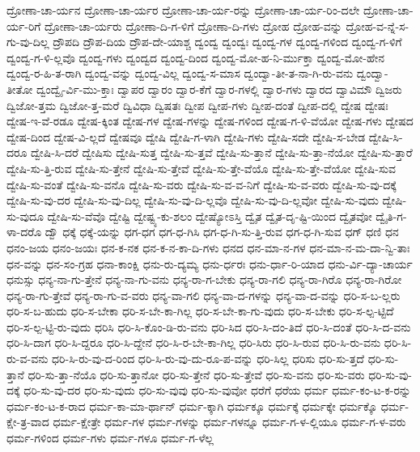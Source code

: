{ದ್ರೋಣಾ-ಚಾ-ರ್ಯನ
ದ್ರೋಣಾ-ಚಾ-ರ್ಯರ
ದ್ರೋಣಾ-ಚಾ-ರ್ಯ-ರನ್ನು
ದ್ರೋಣಾ-ಚಾ-ರ್ಯ-ರಿಂ-ದಲೇ
ದ್ರೋಣಾ-ಚಾ-ರ್ಯ-ರಿಗೆ
ದ್ರೋಣಾ-ಚಾ-ರ್ಯರು
ದ್ರೋಣಾ-ದಿ-ಗ-ಳಿಗೆ
ದ್ರೋಣಾ-ದಿ-ಗಳು
ದ್ರೋಹ
ದ್ರೋಹ-ವನ್ನು
ದ್ರೋಹ-ವ-ನ್ನೆ-ಸ-ಗು-ವು-ದಿಲ್ಲ
ದ್ರೌಪದಿ
ದ್ರೌಪ-ದಿಯ
ದ್ರೌಪ-ದೇ-ಯಾಶ್ಚ
ದ್ವಂದ್ವ
ದ್ವಂದ್ವಃ
ದ್ವಂದ್ವ-ಗಳ
ದ್ವಂದ್ವ-ಗಳಿಂದ
ದ್ವಂದ್ವ-ಗ-ಳಿಗೆ
ದ್ವಂದ್ವ-ಗ-ಳಿ-ಲ್ಲವೊ
ದ್ವಂದ್ವ-ಗಳು
ದ್ವಂದ್ವದ
ದ್ವಂದ್ವ-ದಿಂದ
ದ್ವಂದ್ವ-ಮೋ-ಹ-ನಿ-ರ್ಮುಕ್ತಾ
ದ್ವಂದ್ವ-ಮೋ-ಹೇನ
ದ್ವಂದ್ವ-ರ-ಹಿ-ತ-ರಾಗಿ
ದ್ವಂದ್ವ-ವನ್ನು
ದ್ವಂದ್ವ-ವಿಲ್ಲ
ದ್ವಂದ್ವ-ಸ-ಮಾಸ
ದ್ವಂದ್ವಾ-ತೀ-ತ-ನಾ-ಗಿ-ರು-ವನು
ದ್ವಂದ್ವಾ-ತೀತೋ
ದ್ವಂದ್ವೈ-ರ್ವಿ-ಮು-ಕ್ತಾಃ
ದ್ವಾಪರ
ದ್ವಾರಂ
ದ್ವಾರ-ಕೆಗೆ
ದ್ವಾರ-ಗಳಲ್ಲಿ
ದ್ವಾರ-ಗಳು
ದ್ವಾರದ
ದ್ವಾವಿಮೌ
ದ್ವಿಜರು
ದ್ವಿಜೋ-ತ್ತಮ
ದ್ವಿಜೋ-ತ್ತ-ಮರೆ
ದ್ವಿವಿಧಾ
ದ್ವಿಷತಃ
ದ್ವೀಪ
ದ್ವೀಪ-ಗಳು
ದ್ವೀಪ-ದಂತೆ
ದ್ವೀಪ-ದಲ್ಲಿ
ದ್ವೇಷ
ದ್ವೇಷಃ
ದ್ವೇಷ-ಇ-ವೆ-ರಡೂ
ದ್ವೇಷ-ಕ್ಕಿಂತ
ದ್ವೇಷ-ಗಳ
ದ್ವೇಷ-ಗಳನ್ನು
ದ್ವೇಷ-ಗಳಿಂದ
ದ್ವೇಷ-ಗ-ಳಿ-ವೆಯೋ
ದ್ವೇಷ-ಗಳು
ದ್ವೇಷದ
ದ್ವೇಷ-ದಿಂದ
ದ್ವೇಷ-ವಿ-ಲ್ಲದೆ
ದ್ವೇಷವೂ
ದ್ವೇಷಿ
ದ್ವೇಷಿ-ಗ-ಳಾಗಿ
ದ್ವೇಷಿ-ಗಳು
ದ್ವೇಷಿ-ಸದೇ
ದ್ವೇಷಿ-ಸ-ಬೇಡ
ದ್ವೇಷಿ-ಸಿ-ದರೂ
ದ್ವೇಷಿ-ಸಿ-ದರೆ
ದ್ವೇಷಿಸು
ದ್ವೇಷಿ-ಸುತ್ತ
ದ್ವೇಷಿ-ಸು-ತ್ತವೆ
ದ್ವೇಷಿ-ಸು-ತ್ತಾನೆ
ದ್ವೇಷಿ-ಸು-ತ್ತಾ-ನೆಯೋ
ದ್ವೇಷಿ-ಸು-ತ್ತಾರೆ
ದ್ವೇಷಿ-ಸು-ತ್ತಿ-ರುವ
ದ್ವೇಷಿ-ಸು-ತ್ತೇನೆ
ದ್ವೇಷಿ-ಸು-ತ್ತೇವೆ
ದ್ವೇಷಿ-ಸು-ತ್ತೇ-ವೆಯೊ
ದ್ವೇಷಿ-ಸು-ತ್ತೇ-ವೆಯೋ
ದ್ವೇಷಿ-ಸುವ
ದ್ವೇಷಿ-ಸು-ವಂತೆ
ದ್ವೇಷಿ-ಸು-ವನೊ
ದ್ವೇಷಿ-ಸು-ವರು
ದ್ವೇಷಿ-ಸು-ವ-ವ-ನಿಗೆ
ದ್ವೇಷಿ-ಸು-ವ-ವರು
ದ್ವೇಷಿ-ಸು-ವು-ದಕ್ಕೆ
ದ್ವೇಷಿ-ಸು-ವು-ದರ
ದ್ವೇಷಿ-ಸು-ವು-ದಿಲ್ಲ
ದ್ವೇಷಿ-ಸು-ವು-ದಿ-ಲ್ಲವೊ
ದ್ವೇಷಿ-ಸು-ವು-ದಿ-ಲ್ಲವೋ
ದ್ವೇಷಿ-ಸು-ವುದು
ದ್ವೇಷಿ-ಸು-ವುದೂ
ದ್ವೇಷಿ-ಸು-ವೆವೊ
ದ್ವೇಷ್ಟಿ
ದ್ವೇಷ್ಟ್ಯ-ಕು-ಶಲಂ
ದ್ವೇಷ್ಯೋಽಸ್ತಿ
ದ್ವೈತ
ದ್ವೈತ-ದೃ-ಷ್ಟಿ-ಯಿಂದ
ದ್ವೈತವೋ
ದ್ವೈತಿ-ಗ-ಳಾ-ದರೊ
ದ್ವೌ
ಧಕ್ಕೆ
ಧಕ್ಕೆ-ಯನ್ನು
ಧಗ-ಧಗ
ಧಗ-ಧ-ಗಿಸಿ
ಧಗ-ಧ-ಗಿ-ಸು-ತ್ತಿ-ರುವ
ಧಗ-ಧ-ಗಿ-ಸುವ
ಧಗ್
ಧಣಿ
ಧನ
ಧನಂ-ಜಯ
ಧನಂ-ಜಯಃ
ಧನ-ಕ-ನಕ
ಧನ-ಕ-ನ-ಕಾ-ದಿ-ಗಳು
ಧನದ
ಧನ-ಮಾ-ನ-ಗಳ
ಧನ-ಮಾ-ನ-ಮ-ದಾ-ನ್ವಿ-ತಾಃ
ಧನ-ವನ್ನು
ಧನ-ಸಂ-ಗ್ರಹ
ಧನಾ-ಕಾಂಕ್ಷಿ
ಧನು-ರು-ದ್ಯಮ್ಯ
ಧನು-ರ್ಧರಃ
ಧನು-ರ್ಧಾ-ರಿ-ಯಾದ
ಧನು-ರ್ವಿ-ದ್ಯಾ-ಚಾರ್ಯ
ಧನುಸ್ಸು
ಧನ್ಯ-ನಾ-ಗು-ತ್ತೇನೆ
ಧನ್ಯ-ನಾ-ಗು-ವನು
ಧನ್ಯ-ರಾ-ಗ-ಬೇಕು
ಧನ್ಯ-ರಾ-ಗಲಿ
ಧನ್ಯ-ರಾ-ಗಿರೊ
ಧನ್ಯ-ರಾ-ಗಿರೋ
ಧನ್ಯ-ರಾ-ಗು-ತ್ತೇವೆ
ಧನ್ಯ-ರಾ-ಗು-ವ-ವರು
ಧನ್ಯ-ವಾ-ಗಲಿ
ಧನ್ಯ-ವಾ-ದ-ಗಳನ್ನು
ಧನ್ಯ-ವಾ-ದ-ವನ್ನು
ಧರಿ-ಸ-ಬ-ಲ್ಲರು
ಧರಿ-ಸ-ಬ-ಹುದು
ಧರಿ-ಸ-ಬೇಕಾ
ಧರಿ-ಸ-ಬೇ-ಕಾ-ಗಿಲ್ಲ
ಧರಿ-ಸ-ಬೇ-ಕಾ-ಗು-ವುದು
ಧರಿ-ಸ-ಬೇಕು
ಧರಿ-ಸ-ಲ್ಪ-ಟ್ಟಿದೆ
ಧರಿ-ಸ-ಲ್ಪ-ಟ್ಟಿ-ರು-ವುದು
ಧರಿಸಿ
ಧರಿ-ಸಿ-ಕೊಂ-ಡಿ-ರು-ವನು
ಧರಿ-ಸಿದ
ಧರಿ-ಸಿ-ದಂ-ತಿದೆ
ಧರಿ-ಸಿ-ದಂತೆ
ಧರಿ-ಸಿ-ದ-ವನು
ಧರಿ-ಸಿ-ದಾಗ
ಧರಿ-ಸಿ-ದ್ದರೂ
ಧರಿ-ಸಿ-ದ್ದೇನೆ
ಧರಿ-ಸಿ-ರ-ಬೇ-ಕಾ-ಗಿಲ್ಲ
ಧರಿ-ಸಿರು
ಧರಿ-ಸಿ-ರುವ
ಧರಿ-ಸಿ-ರು-ವನು
ಧರಿ-ಸಿ-ರು-ವ-ವನು
ಧರಿ-ಸಿ-ರು-ವು-ದ-ರಿಂದ
ಧರಿ-ಸಿ-ರು-ವು-ದು-ರೂ-ಪ-ವನ್ನು
ಧರಿ-ಸಿಲ್ಲ
ಧರಿಸು
ಧರಿ-ಸು-ತ್ತದೆ
ಧರಿ-ಸು-ತ್ತಾನೆ
ಧರಿ-ಸು-ತ್ತಾ-ನೆಯೊ
ಧರಿ-ಸು-ತ್ತಾನೋ
ಧರಿ-ಸು-ತ್ತೇನೆ
ಧರಿ-ಸು-ತ್ತೇವೆ
ಧರಿ-ಸು-ವನು
ಧರಿ-ಸು-ವರು
ಧರಿ-ಸು-ವು-ದಕ್ಕೆ
ಧರಿ-ಸು-ವು-ದರ
ಧರಿ-ಸು-ವುದು
ಧರಿ-ಸು-ವುವು
ಧರಿ-ಸು-ವುವೋ
ಧರೆಗೆ
ಧರೆಯ
ಧರ್ಮ
ಧರ್ಮ-ಕಂ-ಟ-ಕ-ರನ್ನು
ಧರ್ಮ-ಕಂ-ಟ-ಕ-ರಾದ
ಧರ್ಮ-ಕಾ-ಮಾ-ರ್ಥಾನ್
ಧರ್ಮ-ಕ್ಕಾಗಿ
ಧರ್ಮಕ್ಕೂ
ಧರ್ಮಕ್ಕೆ
ಧರ್ಮಕ್ಕೇ
ಧರ್ಮಕ್ಕೊ
ಧರ್ಮ-ಕ್ಷೇ-ತ್ರ-ವಾದ
ಧರ್ಮ-ಕ್ಷೇತ್ರೇ
ಧರ್ಮ-ಗಳ
ಧರ್ಮ-ಗಳನ್ನು
ಧರ್ಮ-ಗಳನ್ನೂ
ಧರ್ಮ-ಗ-ಳ-ಲ್ಲಿಯೂ
ಧರ್ಮ-ಗ-ಳ-ವರು
ಧರ್ಮ-ಗಳಿಂದ
ಧರ್ಮ-ಗಳು
ಧರ್ಮ-ಗಳೂ
ಧರ್ಮ-ಗ-ಳೆಲ್ಲ
}
